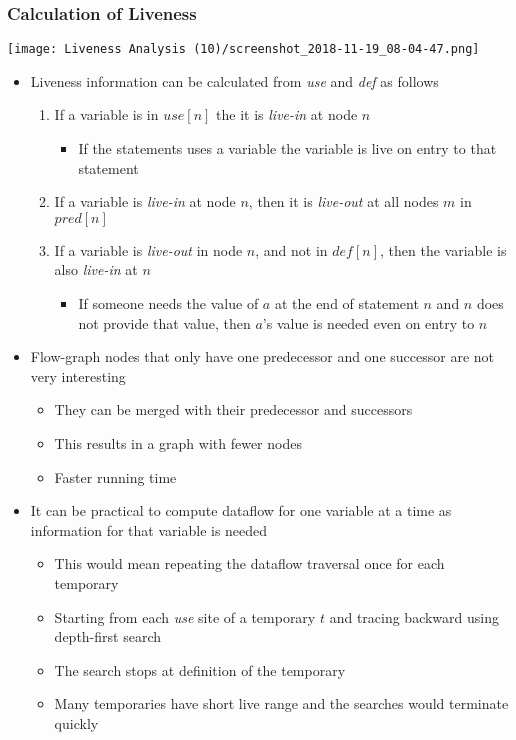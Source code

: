 \documentclass[11pt]{article}
\begin{document}
\subsubsection{Calculation of Liveness}
\label{sec:org4dcba7a}
\begin{center}
\texttt{[image: Liveness Analysis (10)/screenshot\_2018-11-19\_08-04-47.png]}
\end{center}
\begin{itemize}
\item Liveness information can be calculated from \emph{use} and \emph{def} as follows
\begin{enumerate}
\item If a variable is in \(use[n]\) the it is \emph{live-in} at node \(n\)
\begin{itemize}
\item If the statements uses a variable the variable is live on entry to that statement
\end{itemize}
\item If a variable is \emph{live-in} at node \(n\), then it is \emph{live-out} at all nodes \(m\) in \(pred[n]\)
\item If a variable is \emph{live-out} in node \(n\), and not in \(def[n]\), then the variable is also \emph{live-in} at \(n\)
\begin{itemize}
\item If someone needs the value of \(a\) at the end of statement \(n\) and \(n\) does not provide that value, then \(a\)'s value is needed even on entry to \(n\)
\end{itemize}
\end{enumerate}

\item Flow-graph nodes that only have one predecessor and one successor are not very interesting
\begin{itemize}
\item They can be merged with their predecessor and successors
\item This results in a graph with fewer nodes
\item Faster running time
\end{itemize}

\item It can be practical to compute dataflow for one variable at a time as information for that variable is needed
\begin{itemize}
\item This would mean repeating the dataflow traversal once for each temporary
\item Starting from each \emph{use} site of a temporary \(t\) and tracing backward using depth-first search
\item The search stops at definition of the temporary
\item Many temporaries have short live range and the searches would terminate quickly
\end{itemize}
\end{itemize}
\end{document}
